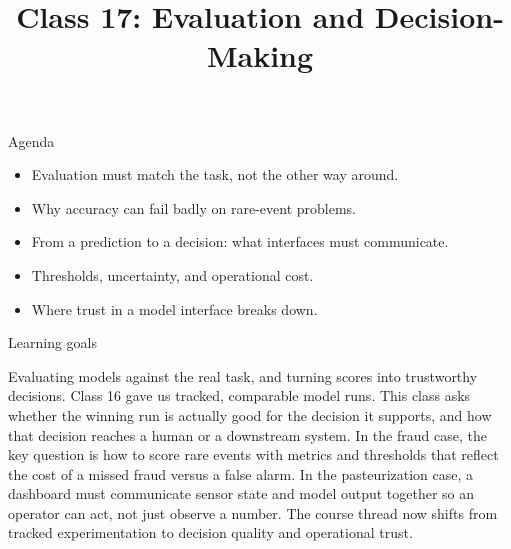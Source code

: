 

\title{Class 17: Evaluation and Decision-Making}
\author{\coursename}
\date{}



\frame{\titlepage \coursefooter}

\begin{frame}{Agenda}
\begin{itemize}
\item Evaluation must match the task, not the other way around.
\item Why accuracy can fail badly on rare-event problems.
\item From a prediction to a decision: what interfaces must communicate.
\item Thresholds, uncertainty, and operational cost.
\item Where trust in a model interface breaks down.
\end{itemize}
\coursefooter
\end{frame}

\begin{frame}{Learning goals}
\coursefooter
\end{frame}

\coursecontextframe
{Evaluating models against the real task, and turning scores into trustworthy decisions.}
{Class 16 gave us tracked, comparable model runs. This class asks whether the winning run is actually good for the decision it supports, and how that decision reaches a human or a downstream system.}
{In the fraud case, the key question is how to score rare events with metrics and thresholds that reflect the cost of a missed fraud versus a false alarm.}
{In the pasteurization case, a dashboard must communicate sensor state and model output together so an operator can act, not just observe a number.}
{The course thread now shifts from tracked experimentation to decision quality and operational trust.}

